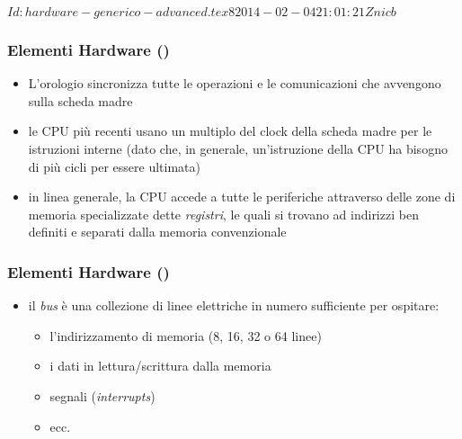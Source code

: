 %
%
%
%
%
\svnInfo $Id: hardware-generico-advanced.tex 8 2014-02-04 21:01:21Z nicb $

\begin{frame}
    \frametitle{Elementi Hardware ()}

	\begin{itemize}[<+- | alert@+->]

		\item L'orologio sincronizza tutte le operazioni
			  e le comunicazioni che avvengono sulla
			  scheda madre

		\item le CPU pi\`u recenti usano un multiplo del clock della scheda madre per
			  le istruzioni interne (dato che, in generale,
			  un'istruzione della CPU ha bisogno di pi\`u cicli per essere
			  ultimata)

		\item in linea generale, la CPU accede a tutte le periferiche
		      attraverso delle zone di memoria specializzate
			  dette \emph{registri}, le quali si trovano ad indirizzi ben definiti
			  e separati dalla memoria convenzionale

	\end{itemize}

\end{frame}

\begin{frame}
    \frametitle{Elementi Hardware ()}

	\begin{itemize}[<+- | alert@+->]

		\item il \emph{bus} \`e una collezione di linee elettriche
              in numero sufficiente per ospitare:

			  \begin{itemize}[<+- | alert@+->]

				\item l'indirizzamento di memoria (8, 16, 32 o 64 linee)

				\item i dati in lettura/scrittura dalla memoria

				\item segnali (\emph{interrupts})

				\item ecc.

			  \end{itemize}

	\end{itemize}

\end{frame}

